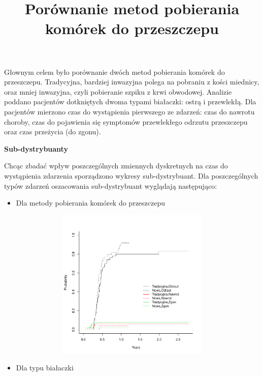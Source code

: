 \documentclass[]{article}
\title{Porównanie metod pobierania komórek do przeszczepu}
\author{}
\date{}
\begin{document}
\maketitle


\thispagestyle{fancy}

Głownym celem było porównanie dwóch metod pobierania komórek do
przeszczepu. Tradycyjna, bardziej inwazyjna polega na pobraniu z kości
miednicy, oraz mniej inwazyjna, czyli pobieranie szpiku z krwi
obwodowej. Analizie poddano pacjentów dotkniętych dwoma typami
białaczki: ostrą i przewlekłą. Dla pacjentów mierzono czas do
wystąpienia pierwszego ze zdarzeń: czas do nawrotu choroby, czas do
pojawienia się symptomów przewlekłego odrzutu przeszczepu oraz czas
przeżycia (do zgonu).

\vspace{10pt}

\textbf{Sub-dystrybuanty}

Chcąc zbadać wpływ poszczególnych zmiennych dyskretnych na czas do
wystąpienia zdarzenia sporządzono wykresy sub-dystrybuant. Dla
poszczególnych typów zdarzeń oszacowania sub-dystrybuant wyglądają
następująco:

\begin{itemize}
\itemsep1pt\parskip0pt
\item
  Dla metody pobierania komórek do przeszczepu
\end{itemize}

\vspace{-22pt}

\includegraphics[width=16cm,height=7.2cm]{plot1.pdf}

\begin{itemize}
\itemsep1pt\parskip0pt
\item
  Dla typu białaczki
\end{itemize}
\end{document}
